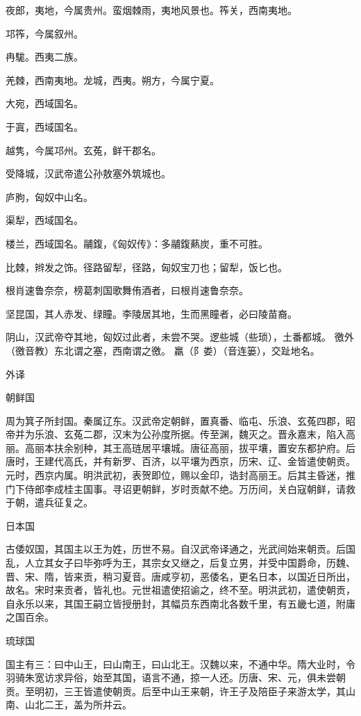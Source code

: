 \documentclass[a4paper,12pt,UTF8,twoside]{ctexbook}
\begin{document}
    夜郎，夷地，今属贵州。蛮烟棘雨，夷地风景也。筰关，西南夷地。
    
    邛筰，今属叙州。
    
    冉駹。西夷二族。
    
    羌棘，西南夷地。龙城，西夷。朔方，今属宁夏。
    
    大宛，西域国名。
    
    于寘，西域国名。
    
    越隽，今属邛州。玄菟，鲜干郡名。
    
    受降城，汉武帝遣公孙敖塞外筑城也。
    
    庐朐，匈奴中山名。
    
    渠犁，西域国名。
    
    楼兰，西域国名。鬴鍑，《匈奴传》：多鬴鍑爇炭，重不可胜。
    
    比棘，辫发之饰。径路留犁，径路，匈奴宝刀也；留犁，饭匕也。
    
    根肖速鲁奈奈，榜葛刺国歌舞侑酒者，曰根肖速鲁奈奈。
    
    坚昆国，其人赤发、绿瞳。李陵居其地，生而黑瞳者，必曰陵苗裔。
    
    阴山，汉武帝夺其地，匈奴过此者，未尝不哭。逻些城（些琐），土番都城。 徼外（徼音教）东北谓之塞，西南谓之徼。 羸（阝娄）（音连篓），交趾地名。
    
    外译
    
    朝鲜国
    
    周为箕子所封国。秦属辽东。汉武帝定朝鲜，置真番、临屯、乐浪、玄菟四郡，昭帝并为乐浪、玄菟二郡，汉末为公孙度所据。传至渊，魏灭之。晋永嘉末，陷入高丽。高丽本扶余别种，其王高琏居平壤城。唐征高丽，拔平壤，置安东都护府。后唐时，王建代高氏，并有新罗、百济，以平壤为西京，历宋、辽、金皆遣使朝贡。元时，西京内属。明洪武初，表贺即位，赐以金印，诰封高丽王。后其主昏迷，推门下侍郎李成桂主国事。寻诏更朝鲜，岁时贡献不绝。万历间，关白寇朝鲜，请救于朝，遣兵征复之。
    
    日本国
    
    古倭奴国，其国主以王为姓，历世不易。自汉武帝译通之，光武间始来朝贡。后国乱，人立其女子曰毕弥呼为王，其宗女又继之，后复立男，并受中国爵命，历魏、晋、宋、隋，皆来贡，稍习夏音。唐咸亨初，恶倭名，更名日本，以国近日所出，故名。宋时来贡者，皆礼也。元世祖遣使招谕之，终不至。明洪武初，遣使朝贡，自永乐以来，其国王嗣立皆授册封，其幅员东西南北各数千里，有五畿七道，附庸之国百余。
    
    琉球国
    
    国主有三：曰中山王，曰山南王，曰山北王。汉魏以来，不通中华。隋大业时，令羽骑朱宽访求异俗，始至其国，语言不通，掠一人还。历唐、宋、元，俱未尝朝贡。至明初，三王皆遣使朝贡。后至中山王来朝，许王子及陪臣子来游太学，其山南、山北二王，盖为所并云。
    
\end{document}
